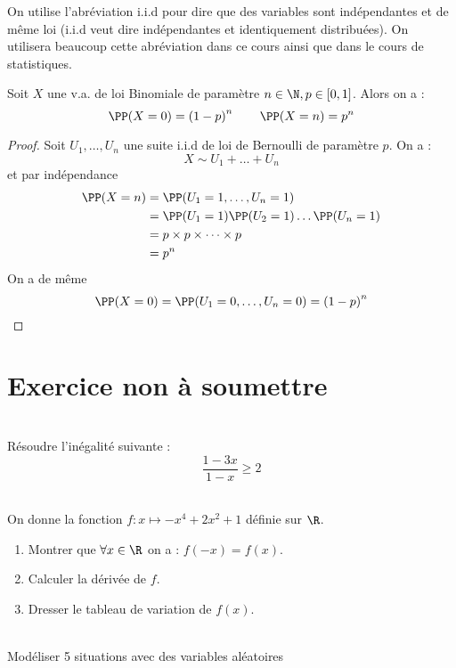 \documentclass[12pt,fleqn]{report} %
\begin{document}
\begin{remark}
	On utilise l'abréviation i.i.d pour dire que des variables sont indépendantes et de même loi (i.i.d veut dire indépendantes et identiquement distribuées). On utilisera beaucoup cette abréviation dans ce cours ainsi que dans le cours de statistiques.
\end{remark}

\begin{proposition}
	Soit $X$ une v.a. de loi Binomiale de paramètre $n\in \N,p\in [0,1]$. Alors on a :\[
	\PP(X = 0) = \left(1 - p\right)^n \qquad \PP(X = n) = p^n
	\]
\end{proposition}
\begin{proof}
	Soit $U_1,\dots,U_n$ une suite i.i.d de loi de Bernoulli de paramètre $p$. On a : \[
	X \sim U_1 + \dots + U_n
	\]
	et par indépendance \begin{align*}
	\PP(X = n) & = \PP(U_1 = 1,\dots , U_n = 1) \\
	& = \PP(U_1 = 1) \PP(U_2 = 1) \dots \PP(U_n = 1) \\
	& = p\times p \times \dots \times p \\
	& = p^n
	\end{align*}
	On a de même \[
	\PP(X = 0) = \PP(U_1 =0, \dots , U_n = 0) = \left(1 - p\right)^n
	\]
\end{proof}


\chapter*{Exercice non à soumettre}
\begin{exercise}\label{Exercice 1}\text{ }\\
	{Résoudre l'inégalité suivante :}
	\[
	\frac{1-3 x}{1 - x}\ge 2
	\]
\end{exercise}
\begin{exercise}\label{Exercice 7}\text{ }\\
	On donne la fonction $f:x \mapsto -x^4 + 2x^2 + 1$ déﬁnie sur $\R$. 
	\begin{enumerate}
		\item Montrer que $\forall x \in \R$ on a : $f(-x) = f(x)$.
		\item Calculer la dérivée de $f$.
		\item Dresser le tableau de variation de $f(x)$.
	\end{enumerate}
\end{exercise}

\begin{exercise}\label{Exercice 53}\text{ }\\
	Modéliser 5 situations avec des variables aléatoires
\end{exercise}
\end{document}
